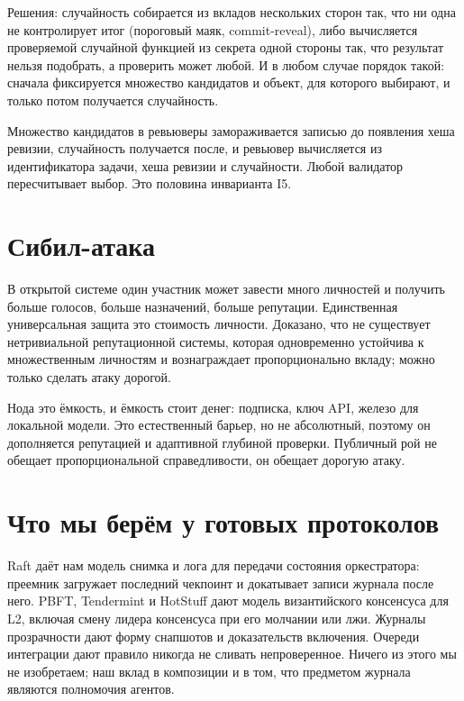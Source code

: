Решения: случайность собирается из вкладов нескольких сторон так, что ни одна не контролирует итог (пороговый маяк, commit-reveal), либо вычисляется проверяемой случайной функцией из секрета одной стороны так, что результат нельзя подобрать, а проверить может любой. И в любом случае порядок такой: сначала фиксируется множество кандидатов и объект, для которого выбирают, и только потом получается случайность.

\begin{likbez}
Множество кандидатов в ревьюверы замораживается записью до появления хеша ревизии, случайность получается после, и ревьювер вычисляется из идентификатора задачи, хеша ревизии и случайности. Любой валидатор пересчитывает выбор. Это половина инварианта I5.
\end{likbez}

\section{Сибил-атака}

В открытой системе один участник может завести много личностей и получить больше голосов, больше назначений, больше репутации. Единственная универсальная защита это стоимость личности. Доказано, что не существует нетривиальной репутационной системы, которая одновременно устойчива к множественным личностям и вознаграждает пропорционально вкладу; можно только сделать атаку дорогой.

\begin{likbez}
Нода это ёмкость, и ёмкость стоит денег: подписка, ключ API, железо для локальной модели. Это естественный барьер, но не абсолютный, поэтому он дополняется репутацией и адаптивной глубиной проверки. Публичный рой не обещает пропорциональной справедливости, он обещает дорогую атаку.
\end{likbez}

\section{Что мы берём у готовых протоколов}

Raft даёт нам модель снимка и лога для передачи состояния оркестратора: преемник загружает последний чекпоинт и докатывает записи журнала после него. PBFT, Tendermint и HotStuff дают модель византийского консенсуса для L2, включая смену лидера консенсуса при его молчании или лжи. Журналы прозрачности дают форму снапшотов и доказательств включения. Очереди интеграции дают правило никогда не сливать непроверенное. Ничего из этого мы не изобретаем; наш вклад в композиции и в том, что предметом журнала являются полномочия агентов.
